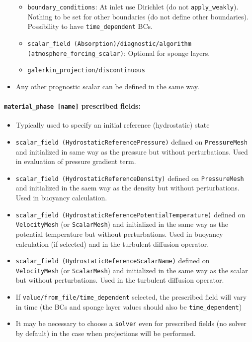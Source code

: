 \documentclass[10pt,a4paper]{article}
\begin{document}
\begin{itemize}
\begin{itemize}
\item \texttt{boundary\_conditions}: At inlet use Dirichlet (do not \texttt{apply\_weakly}). Nothing to be set for other boundaries (do not define other boundaries). Possibility to have \texttt{time\_dependent} BCs.
\item \texttt{scalar\_field (Absorption)/diagnostic/algorithm (atmosphere\_forcing\_scalar)}: Optional for sponge layers.
\item \texttt{galerkin\_projection/discontinuous}
\end{itemize}
\item Any other prognostic scalar can be defined in the same way.
\end{itemize}

\paragraph{\texttt{material\_phase [name]} prescribed fields:}
\begin{itemize}
\item Typically used to specify an initial reference (hydrostatic) state
\item \texttt{scalar\_field (HydrostaticReferencePressure)} defined on \texttt{PressureMesh} and initialized in same way as the pressure but without perturbations. Used in evaluation of pressure gradient term.
\item \texttt{scalar\_field (HydrostaticReferenceDensity)} defined on \texttt{PressureMesh} and initialized in the saem way as the density but without perturbations. Used in buoyancy calculation.
\item \texttt{scalar\_field (HydrostaticReferencePotentialTemperature)} defined on \texttt{VelocityMesh} (or \texttt{ScalarMesh}) and initialized in the same way as the potential temperature but without perturbations. Used in buoyancy calculation (if selected) and in the turbulent diffusion operator.
\item \texttt{scalar\_field (HydrostaticReferenceScalarName)} defined on \texttt{VelocityMesh} (or \texttt{ScalarMesh}) and initialized in the same way as the scalar but without perturbations. Used in the turbulent diffusion operator.
\item If \texttt{value/from\_file/time\_dependent} selected, the prescribed field will vary in time (the BCs and sponge layer values should also be \texttt{time\_dependent})
\item It may be necessary to choose a \texttt{solver} even for prescribed fields (no solver by default) in the case when projections will be performed.
\end{itemize}
\end{document}
